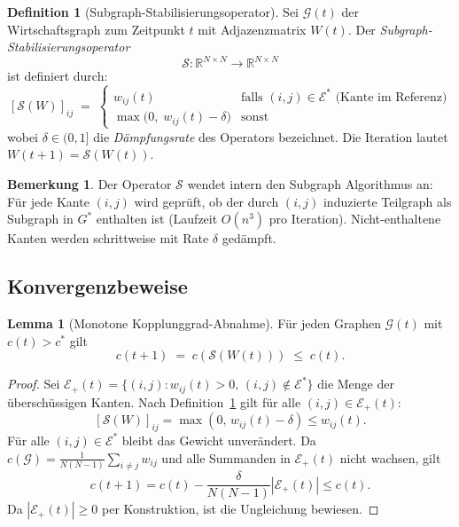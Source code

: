 ﻿\documentclass[a4paper,12pt]{article}
\theoremstyle{definition}
\newtheorem{definition}{Definition}
\newtheorem{lemma}{Lemma}
\newtheorem{bemerkung}{Bemerkung}
\begin{document}
\begin{definition}[Subgraph-Stabilisierungsoperator]
\label{def:stabop}
    Sei $\mathcal{G}(t)$ der Wirtschaftsgraph zum Zeitpunkt $t$ mit Adjazenzmatrix $W(t)$.
    Der \emph{Subgraph-Stabilisierungsoperator}
    \[
        \mathcal{S} : \mathbb{R}^{N \times N} \to \mathbb{R}^{N \times N}
    \]
    ist definiert durch:
    \[
        [\mathcal{S}(W)]_{ij} \;=\;
        \begin{cases}
            w_{ij}(t) & \text{falls } (i,j) \in \mathcal{E}^* \text{ (Kante im Referenz)} \\
            \max\!\bigl(0,\; w_{ij}(t) - \delta\bigr) & \text{sonst}
        \end{cases}
    \]
    wobei $\delta \in (0,1]$ die \emph{Dämpfungsrate} des Operators bezeichnet.
    Die Iteration lautet $W(t+1) = \mathcal{S}(W(t))$.
\end{definition}

\begin{bemerkung}
    Der Operator $\mathcal{S}$ wendet intern den Subgraph Algorithmus an: Für jede
    Kante $(i,j)$ wird geprüft, ob der durch $(i,j)$ induzierte Teilgraph
    als Subgraph in $G^*$ enthalten ist (Laufzeit $O(n^3)$ pro Iteration).
    Nicht-enthaltene Kanten werden schrittweise mit Rate $\delta$ gedämpft.
\end{bemerkung}

\subsection{Konvergenzbeweise}

\begin{lemma}[Monotone Kopplung\-grad-Abnahme]
\label{lem:mono_c}
    Für jeden Graphen $\mathcal{G}(t)$ mit $c(t) > c^*$ gilt
    \[
        c(t+1) \;=\; c(\mathcal{S}(W(t))) \;\leq\; c(t).
    \]
\end{lemma}

\begin{proof}
    Sei $\mathcal{E}_+(t) = \{(i,j) : w_{ij}(t) > 0,\, (i,j) \notin \mathcal{E}^*\}$
    die Menge der überschüssigen Kanten. Nach Definition~\ref{def:stabop} gilt für
    alle $(i,j) \in \mathcal{E}_+(t)$:
    \[
        [\mathcal{S}(W)]_{ij} = \max(0,\, w_{ij}(t) - \delta) \leq w_{ij}(t).
    \]
    Für alle $(i,j) \in \mathcal{E}^*$ bleibt das Gewicht unverändert. Da
    $c(\mathcal{G}) = \frac{1}{N(N-1)}\sum_{i \neq j} w_{ij}$ und alle
    Summanden in $\mathcal{E}_+(t)$ nicht wachsen, gilt
    \[
        c(t+1) = c(t) - \frac{\delta}{N(N-1)} |\mathcal{E}_+(t)| \leq c(t).
    \]
    Da $|\mathcal{E}_+(t)| \geq 0$ per Konstruktion, ist die Ungleichung bewiesen.
\end{proof}
\end{document}
